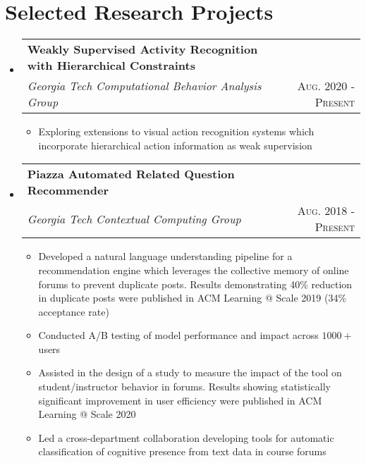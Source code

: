 \documentclass[letterpaper,11pt]{article}
\makeatletter
\newcommand{\resumePlainItem}[1]{
  \item\small{#1 \vspace{-2pt}}
}
\newcommand{\resumeSubheading}[4]{
  \vspace{-1pt}\item[]
    \begin{tabular*}{0.97\textwidth}{l@{\extracolsep{\fill}}r}
      \textbf{#1} & #2 \\
      \textit{\small#3} & \textsc{\small #4} \\ %
    \end{tabular*}\vspace{-5pt}
}
\newcommand{\resumeSubHeadingListStart}{\begin{itemize}[leftmargin=*]}
\newcommand{\resumeSubHeadingListEnd}{\end{itemize}}
\newcommand{\resumeItemListStart}{\begin{itemize}}
\newcommand{\resumeItemListEnd}{\end{itemize}\vspace{-5pt}}
\newenvironment{resumeItemList}{\resumeItemListStart}{\resumeItemListEnd}
\newenvironment{resumeSubheadingList}{\resumeSubHeadingListStart}{\resumeSubHeadingListEnd}
\makeatother
\begin{document}
\section{Selected Research Projects}
  \begin{resumeSubheadingList}
    \resumeSubheading{Weakly Supervised Activity Recognition with Hierarchical Constraints}{}
    {Georgia Tech Computational Behavior Analysis Group}{Aug. 2020 - Present}
    \begin{resumeItemList}
      \resumePlainItem{Exploring extensions to visual action recognition systems which 
      incorporate hierarchical action information as weak supervision}
    \end{resumeItemList}
    \resumeSubheading
    {Piazza Automated Related Question Recommender}{} %
    {Georgia Tech Contextual Computing Group}{Aug. 2018 - Present}
    \begin{resumeItemList}
      \resumePlainItem{Developed a natural language understanding pipeline
      for a recommendation engine which leverages the collective memory of
      online forums to prevent duplicate posts. Results demonstrating 40\% reduction in
      duplicate posts were published in ACM Learning @ Scale 2019 (34\% acceptance rate)}
      \resumePlainItem{Conducted A/B testing of model performance and impact across $1000+$ users}
      \resumePlainItem{Assisted in the design of a study to measure the impact of
      the tool on student/instructor behavior in forums. Results showing statistically significant
      improvement in user efficiency were published in ACM Learning @ Scale 2020}
      \resumePlainItem{Led a cross-department collaboration developing tools for automatic classification
      of cognitive presence from text data in course forums}
    \end{resumeItemList}


\end{resumeSubheadingList}
\end{document}
